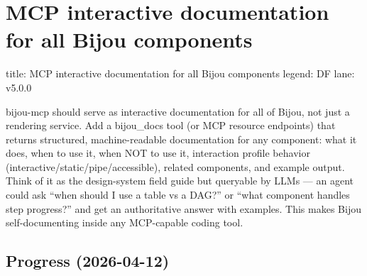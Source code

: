 \chapter{MCP interactive documentation for all Bijou components}\label{record-294}

\smallskip

\begin{RecordMeta}
title: MCP interactive documentation for all Bijou components
legend: DF
lane: v5.0.0

\end{RecordMeta}

bijou-mcp should serve as interactive documentation for all of Bijou, not just a rendering service. Add a bijou\_docs tool (or MCP resource endpoints) that returns structured, machine-readable documentation for any component: what it does, when to use it, when NOT to use it, interaction profile behavior (interactive/static/pipe/accessible), related components, and example output. Think of it as the design-system field guide but queryable by LLMs --- an agent could ask ``when should I use a table vs a DAG?'' or ``what component handles step progress?'' and get an authoritative answer with examples. This makes Bijou self-documenting inside any MCP-capable coding tool.

\section{Progress (2026-04-12)}\label{record-294-progress-2026-04-12}


